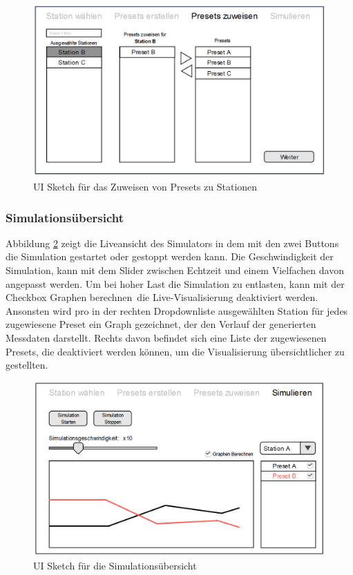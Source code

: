 \begin{figure}[H]
\centering
\includegraphics[width=1\textwidth]{pictures/sketches/simulator/assign_preset.png}
\caption{UI Sketch für das Zuweisen von Presets zu Stationen}
\label{fig:sketch_assign_preset}
\end{figure}
\raggedright

\newpage

\subsubsection{Simulationsübersicht}

Abbildung \ref{fig:sketch_simulation} zeigt die Liveansicht des Simulators in dem mit den zwei Buttons die Simulation gestartet oder gestoppt werden kann. Die Geschwindigkeit der Simulation, kann mit dem Slider zwischen Echtzeit und einem Vielfachen davon angepasst werden. Um bei hoher Last die Simulation zu entlasten, kann mit der Checkbox \glqq Graphen berechnen\grqq\ die Live-Visualisierung deaktiviert werden. Ansonsten wird pro in der rechten Dropdownliste ausgewählten Station für jedes zugewiesene Preset ein Graph gezeichnet, der den Verlauf der generierten Messdaten darstellt. Rechts davon befindet sich eine Liste der zugewiesenen Presets, die deaktiviert werden können, um die Visualisierung übersichtlicher zu gestellten.

\begin{figure}[H]
\centering
\includegraphics[width=1\textwidth]{pictures/sketches/simulator/simulate.png}
\caption{UI Sketch für die Simulationsübersicht}
\label{fig:sketch_simulation}
\end{figure}
\raggedright



